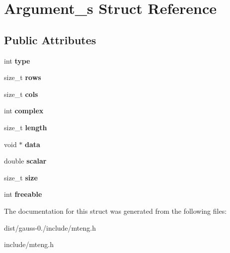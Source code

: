 \hypertarget{struct_argument__s}{\section{Argument\-\_\-s Struct Reference}
\label{struct_argument__s}
}
\subsection*{Public Attributes}
\begin{DoxyCompactItemize}
\item 
\hypertarget{struct_argument__s_a6b7a317e01db8bf2b0eaaef0481a140e}{int {\bfseries type}}\label{struct_argument__s_a6b7a317e01db8bf2b0eaaef0481a140e}

\item 
\hypertarget{struct_argument__s_a0b60ffe4ce05889fce7965d353567ae8}{size\-\_\-t {\bfseries rows}}\label{struct_argument__s_a0b60ffe4ce05889fce7965d353567ae8}

\item 
\hypertarget{struct_argument__s_a397077ea6e3bfa9e789858d145efcac8}{size\-\_\-t {\bfseries cols}}\label{struct_argument__s_a397077ea6e3bfa9e789858d145efcac8}

\item 
\hypertarget{struct_argument__s_ad16925865500dbfe1f98873ecdb4b25b}{int {\bfseries complex}}\label{struct_argument__s_ad16925865500dbfe1f98873ecdb4b25b}

\item 
\hypertarget{struct_argument__s_a8ce7ca6c5eef0d8ffbd2900ea1146b0f}{size\-\_\-t {\bfseries length}}\label{struct_argument__s_a8ce7ca6c5eef0d8ffbd2900ea1146b0f}

\item 
\hypertarget{struct_argument__s_af318a82ba1f8fdb2a9a75c3d6b9c4be9}{void $\ast$ {\bfseries data}}\label{struct_argument__s_af318a82ba1f8fdb2a9a75c3d6b9c4be9}

\item 
\hypertarget{struct_argument__s_ac3197a43a66151c3639003356e88a950}{double {\bfseries scalar}}\label{struct_argument__s_ac3197a43a66151c3639003356e88a950}

\item 
\hypertarget{struct_argument__s_a010b6ce4b98c092484425798e8d6ce25}{size\-\_\-t {\bfseries size}}\label{struct_argument__s_a010b6ce4b98c092484425798e8d6ce25}

\item 
\hypertarget{struct_argument__s_abf13f9cc5aa9cf0d8dbc29ccdd81ffc2}{int {\bfseries freeable}}\label{struct_argument__s_abf13f9cc5aa9cf0d8dbc29ccdd81ffc2}

\end{DoxyCompactItemize}


The documentation for this struct was generated from the following files\-:\begin{DoxyCompactItemize}
\item 
dist/gauss-\/0./include/mteng.\-h\item 
include/mteng.\-h\end{DoxyCompactItemize}
